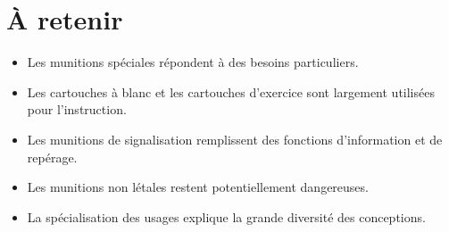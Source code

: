 \section{À retenir}

\begin{aretenir}

\begin{itemize}
    \item Les munitions spéciales répondent à des besoins particuliers.
    \item Les cartouches à blanc et les cartouches d'exercice sont largement
          utilisées pour l'instruction.
    \item Les munitions de signalisation remplissent des fonctions
          d'information et de repérage.
    \item Les munitions non létales restent potentiellement dangereuses.
    \item La spécialisation des usages explique la grande diversité des
          conceptions.
\end{itemize}

\end{aretenir}
